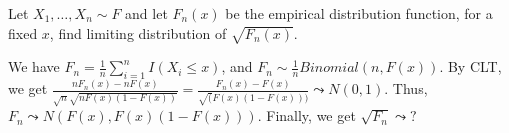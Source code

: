 \begin{problem}
    Let $X_1,\ldots,X_n\sim F$ and let $ F_n(x)$ be the empirical distribution function, for a fixed $x$,  find limiting distribution of $\sqrt{F_n(x)}$.
\end{problem}

\begin{solution}
We have $F_n=\frac{1}{n} \sum_{i=1}^n I(X_i \le x)$, and $F_n \sim \frac{1}{n} Binomial(n, F(x))$.
By CLT, we get $\frac{n F_n(x)- nF(x)}{\sqrt{n}\sqrt{nF(x)(1-F(x))}}=\frac{F_n(x)- F(x)}{\sqrt(F(x)(1-F(x)))} \leadsto N(0,1)$.
Thus, $F_n \leadsto N(F(x), F(x)(1-F(x)))$. Finally, we get $\sqrt{F_n} \leadsto ?$




\end{solution}





